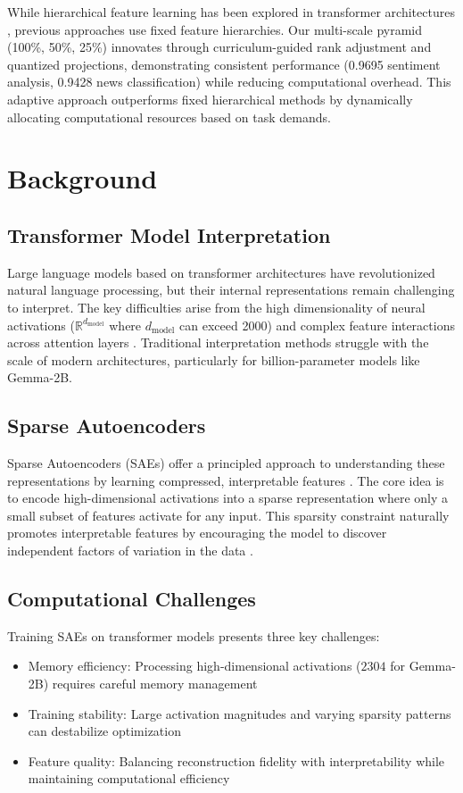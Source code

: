 \documentclass{article} %
\begin{document}
While hierarchical feature learning has been explored in transformer architectures \cite{bahdanau2014neural}, previous approaches use fixed feature hierarchies. Our multi-scale pyramid (100\%, 50\%, 25\%) innovates through curriculum-guided rank adjustment and quantized projections, demonstrating consistent performance (0.9695 sentiment analysis, 0.9428 news classification) while reducing computational overhead. This adaptive approach outperforms fixed hierarchical methods by dynamically allocating computational resources based on task demands.

\section{Background}
\label{sec:background}

\subsection{Transformer Model Interpretation}
Large language models based on transformer architectures \cite{vaswani2017attention} have revolutionized natural language processing, but their internal representations remain challenging to interpret. The key difficulties arise from the high dimensionality of neural activations ($\mathbb{R}^{d_{\text{model}}}$ where $d_{\text{model}}$ can exceed 2000) and complex feature interactions across attention layers \cite{goodfellow2016deep}. Traditional interpretation methods struggle with the scale of modern architectures, particularly for billion-parameter models like Gemma-2B.

\subsection{Sparse Autoencoders}
Sparse Autoencoders (SAEs) offer a principled approach to understanding these representations by learning compressed, interpretable features \cite{Olshausen1996EmergenceOS}. The core idea is to encode high-dimensional activations into a sparse representation where only a small subset of features activate for any input. This sparsity constraint naturally promotes interpretable features by encouraging the model to discover independent factors of variation in the data \cite{Schütze2016LearningED}.

\subsection{Computational Challenges}
Training SAEs on transformer models presents three key challenges:
\begin{itemize}
    \item Memory efficiency: Processing high-dimensional activations ($2304$ for Gemma-2B) requires careful memory management
    \item Training stability: Large activation magnitudes and varying sparsity patterns can destabilize optimization
    \item Feature quality: Balancing reconstruction fidelity with interpretability while maintaining computational efficiency
\end{itemize}
\end{document}
